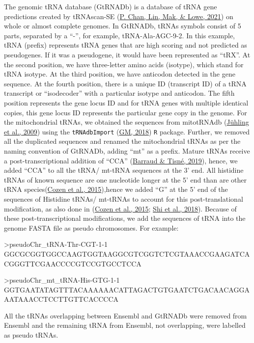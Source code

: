 \documentclass[12pt,twoside]{reedthesis}
\newenvironment{Shaded}{\begin{snugshade}}{\end{snugshade}}
\newcommand{\NormalTok}[1]{#1}
\begin{document}
The genomic tRNA database (GtRNADb) is a database of tRNA gene
predictions created by tRNAscan-SE (\protect\hyperlink{ref-chan2021}{P. Chan, Lin, Mak, \& Lowe, 2021}) on whole or almost
complete genomes. In GtRNADb, tRNAs symbols consist of 5 parts,
separated by a ``-'', for example, tRNA-Ala-AGC-9-2. In this example, tRNA
(prefix) represents tRNA genes that are high scoring and not predicted
as pseudogenes. If it was a pseudogene, it would have been represented
as ``tRX''. At the second position, we have three-letter amino acids
(isotype), which stand for tRNA isotype. At the third position, we have
anticodon detected in the gene sequence. At the fourth position, there
is a unique ID (transcript ID) of a tRNA transcript or ``isodecoder'' with
a particular isotype and anticodon. The fifth position represents the
gene locus ID and for tRNA genes with multiple identical copies, this
gene locus ID represents the particular gene copy in the genome. For the
mitochondrial tRNAs, we obtained the sequences from mitotRNAdb
(\protect\hyperlink{ref-juxfchling2009}{Jühling et al., 2009}) using the \texttt{tRNAdbImport} (\protect\hyperlink{ref-gm2018}{GM, 2018}) \texttt{R} package. Further, we
removed all the duplicated sequences and renamed the mitochondrial tRNAs
as per the naming convention of GtRNADb, adding ``mt'' as a prefix. Mature
tRNAs receive a post-transcriptional addition of ``CCA'' (\protect\hyperlink{ref-barraud2019}{Barraud \& Tisné, 2019}),
hence, we added ``CCA'' to all the tRNA/ mt-tRNA sequences at the 3' end.
All histidine tRNAs of known sequence are one nucleotide longer at the
5' end than are other tRNA species(\protect\hyperlink{ref-cozen2015}{Cozen et al., 2015}),hence we added ``G'' at the 5' end of the sequences of Histidine tRNAs/ mt-tRNAs to account for this post-translational modification, as also
done in (\protect\hyperlink{ref-cozen2015}{Cozen et al., 2015}; \protect\hyperlink{ref-shi2018}{Shi et al., 2018}). Because of these post-transcriptional
modifications, we add the sequences of tRNA into the genome FASTA file
as pseudo chromosomes. For example:
\begin{Shaded}
\begin{Highlighting}[]
\NormalTok{\textgreater{}pseudoChr\_tRNA{-}Thr{-}CGT{-}1{-}1}
\NormalTok{GGCGCGGTGGCCAAGTGGTAAGGCGTCGGTCTCGTAAACCGAAGATCACGGGTTCGAACCCCGTCCGTGCCTCCA}

\NormalTok{\textgreater{}pseudoChr\_mt\_tRNA{-}His{-}GTG{-}1{-}1}
\NormalTok{GGTGAATATAGTTTACAAAAAACATTAGACTGTGAATCTGACAACAGGAAATAAACCTCCTTGTTCACCCCA}
\end{Highlighting}
\end{Shaded}
All the tRNAs overlapping between Ensembl and GtRNADb were removed from
Ensembl and the remaining tRNA from Ensembl, not overlapping, were
labelled as pseudo tRNAs.
\end{document}
